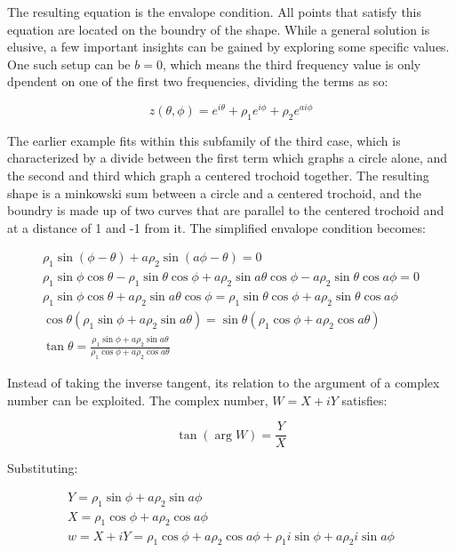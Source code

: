 \documentclass[12pt, a4paper, oneside]{report}
\begin{document}
The resulting equation is the envalope condition. All points that satisfy this equation are located on the boundry of the shape.
While a general solution is elusive, a few important insights can be gained by exploring some specific values. One such setup can be $b = 0$, which means the third frequency value is only dpendent on one of the first two frequencies, dividing the terms as so:

\begin{equation}
  z(\theta, \phi) = e^{i \theta} + \rho_1 e^{i \phi} + \rho_2 e^{a i \phi}
  \label{eq:b=0}
\end{equation}

The earlier example fits within this subfamily of the third case, which is characterized by a divide between the first term which graphs a circle alone, and the second and third which graph a centered trochoid together. The resulting shape is a minkowski sum between a circle and a centered trochoid, and the boundry is made up of two curves that are parallel to the centered trochoid and at a distance of 1 and -1 from it.
The simplified envalope condition becomes:

\begin{gather*}
  \rho_1 \sin(\phi - \theta) + a \rho_2 \sin(a \phi - \theta) = 0 \\
  \rho_1 \sin \phi \cos \theta - \rho_1 \sin \theta \cos \phi + a \rho_2 \sin a \theta \cos \phi - a \rho_2 \sin \theta \cos a \phi = 0 \\
  \rho_1 \sin \phi \cos \theta + a \rho_2 \sin a \theta \cos \phi = \rho_1 \sin \theta \cos \phi + a \rho_2 \sin \theta \cos a \phi \\
  \cos \theta(\rho_1 \sin \phi + a \rho_2 \sin a \theta) = \sin \theta(\rho_1 \cos \phi + a \rho_2 \cos a \theta) \\
  \tan \theta = \frac{\rho_1 \sin \phi + a \rho_2 \sin a \theta}{\rho_1 \cos \phi + a \rho_2 \cos a \theta}
\end{gather*}

Instead of taking the inverse tangent, its relation to the argument of a complex number can be exploited. The complex number, $W = X + iY$ satisfies:

\begin{equation*}
  \tan (\arg{W}) = \frac{Y}{X}
\end{equation*}

Substituting:

\begin{gather*}
  Y = \rho_1 \sin \phi + a \rho_2 \sin a \phi \\
  X = \rho_1 \cos \phi + a \rho_2 \cos a \phi \\
  w = X + iY = \rho_1 \cos \phi + a \rho_2 \cos a \phi + \rho_1 i \sin \phi + a \rho_2 i \sin a \phi
\end{gather*}
\end{document}
